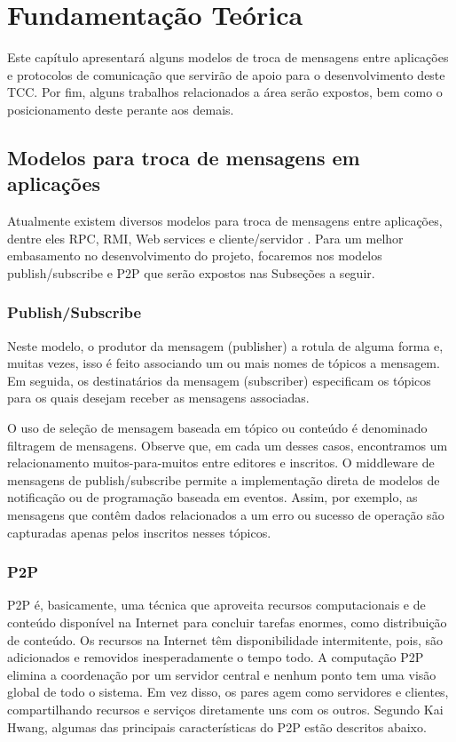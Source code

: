 \chapter{\label{chap:chap2} Fundamentação Teórica}

Este capítulo apresentará alguns modelos de troca de mensagens entre aplicações e protocolos de comunicação que servirão de apoio para o desenvolvimento deste TCC. 
Por fim, alguns trabalhos relacionados a área serão expostos, bem como o posicionamento deste perante aos demais.

\section{Modelos para troca de mensagens em aplicações}

Atualmente existem diversos modelos para troca de mensagens entre aplicações, dentre eles RPC, RMI, Web services e cliente/servidor \cite{Tanenbaum:2006:DSP:1202502}.
Para um melhor embasamento no desenvolvimento do projeto, focaremos nos modelos publish/subscribe e P2P que serão expostos nas Subseções a seguir.

\subsection{Publish/Subscribe}

Neste modelo, o produtor da mensagem (publisher) a rotula de alguma forma e, muitas vezes, isso é feito associando um ou mais nomes de tópicos a mensagem.
Em seguida, os destinatários da mensagem (subscriber) especificam os tópicos para os quais desejam receber as mensagens associadas\cite{Hwang:2011:DCC:2060077}.

O uso de seleção de mensagem baseada em tópico ou conteúdo é denominado filtragem de mensagens.
Observe que, em cada um desses casos, encontramos um relacionamento muitos-para-muitos entre editores e inscritos.
O middleware de mensagens de publish/subscribe permite a implementação direta de modelos de notificação ou de programação baseada em eventos\cite{Hwang:2011:DCC:2060077}.
Assim, por exemplo, as mensagens que contêm dados relacionados a um erro ou sucesso de operação são capturadas apenas pelos inscritos nesses tópicos.

\subsection{P2P}


P2P é, basicamente, uma técnica que aproveita recursos computacionais e de conteúdo disponível na Internet para concluir tarefas enormes, como distribuição de conteúdo.
Os recursos na Internet têm disponibilidade intermitente, pois, são adicionados e removidos inesperadamente o tempo todo.
A computação P2P elimina a coordenação por um servidor central e nenhum ponto tem uma visão global de todo o sistema.
Em vez disso, os pares agem como servidores e clientes, compartilhando recursos e serviços diretamente uns com os outros\cite{Hwang:2011:DCC:2060077}.
Segundo Kai Hwang, algumas das principais características do P2P estão descritos abaixo.

